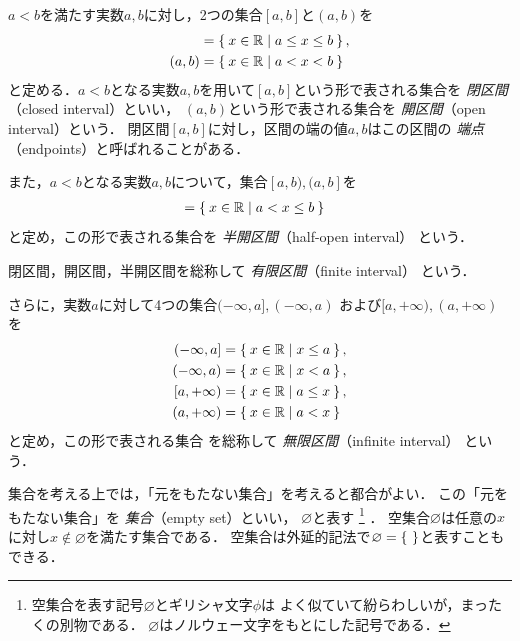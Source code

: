  \begin{ex} \label{ex:kukan}
   $a<b$を満たす実数$a,  b$に対し，2つの集合$[a,b]$と$(a,b)$を
   \begin{align}
     [a,b] & = \Set{x \in \mathbb{R} \mid  a \leq x \leq b} ,
     \label{eq:heikukan} \\
     (a,b) & = \Set{ x \in \mathbb{R} \mid  a < x < b}
     \label{eq:kaikukan}
   \end{align}
   と定める．$a<b$となる実数$a,  b$を用いて$[a,b]$という形で表される集合を
   \emph{閉区間}（closed interval）といい，
   $(a,b)$という形で表される集合を
   \emph{開区間}（open interval）という．
   閉区間$[a,b]$に対し，区間の端の値$a,  b$はこの区間の
   \emph{端点}（endpoints）と呼ばれることがある．

   また，$a<b$となる実数$a,b$について，集合$[a,b),  (a,b]$を
   \begin{align}
     [a,b) & = \Set{ x \in \mathbb{R} \mid  a \leq x < b},
     \label{eq:hankaikukanhidari} \\
     (a,b] & = \Set{ x \in \mathbb{R} \mid  a < x \leq b}
     \label{eq:hankaimigi}
   \end{align}
   と定め，この形で表される集合を
   \emph{半開区間}（half-open interval）
   という．

   閉区間，開区間，半開区間を総称して
   \emph{有限区間}（finite interval）
   という．

   さらに，実数$a$に対して4つの集合$( - \infty , a],  ( -\infty , a)$
   および$[a, + \infty ),  (a, + \infty )$を
   \begin{align}
     (- \infty  , a ] & = \Set{ x \in \mathbb{R} \mid  x \leq a},
     \label{eq:mugenmigileq} \\  
     (- \infty  , a ) & = \Set{ x \in \mathbb{R} \mid  x < a},
     \label{eq:mugenmigi} \\
     [a, + \infty ) & = \Set{ x \in \mathbb{R} \mid  a \leq x},
     \label{eq:mugenhidarileq} \\
     (a,+ \infty ) & = \Set{ x \in \mathbb{R} \mid  a < x}
     \label{eq:mugenhidari} 
   \end{align}
   と定め，この形で表される集合
   を総称して
   \emph{無限区間}（infinite interval）
   という．
 \end{ex}
   集合を考える上では，「元をもたない集合」を考えると都合がよい．
   この「元をもたない集合」を
   \emph{集合}（empty set）といい，
   $\varnothing$と表す
   \footnote{空集合を表す記号$\varnothing$とギリシャ文字$\phi$は
             よく似ていて紛らわしいが，まったくの別物である．
             $\varnothing$はノルウェー文字をもとにした記号である．}
   ．
  空集合$\varnothing$は任意の$x$に対し$x \notin \varnothing$を満たす集合である． 
  空集合は外延的記法で$\varnothing = \set{ }$と表すこともできる．

